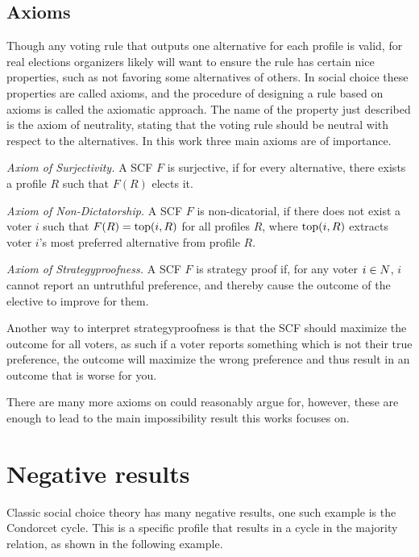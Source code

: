 \subsection{Axioms}
Though any voting rule that outputs one alternative for each profile is valid, for real elections organizers likely will want to ensure the rule has certain nice properties, such as not favoring some alternatives of others. In social choice these properties are called axioms, and the procedure of designing a rule based on axioms is called the axiomatic approach. The name of the property just described is the axiom of neutrality, stating that the voting rule should be neutral with respect to the alternatives. In this work three main axioms are of importance.

\textit{Axiom of Surjectivity.} A SCF $F$ is surjective, if for every alternative, there exists a profile $R$ such that $F(R)$ elects it.

\textit{Axiom of Non-Dictatorship.} A SCF $F$ is non-dicatorial, if there does not exist a voter $i$ such that $F(R) = \textnormal{top}(i,R)$ for all profiles $R$, where $\textnormal{top}(i,R)$  extracts voter $i$'s most preferred alternative from profile $R$.

\textit{Axiom of Strategyproofness.} A SCF $F$ is strategy proof if, for any voter $i \in N$, $i$ cannot report an untruthful preference, and thereby cause the outcome of the elective to improve for them.

Another way to interpret strategyproofness is that the SCF should maximize the outcome for all voters, as such  if a voter reports something which is not their true preference, the outcome will maximize the wrong preference and thus result in an outcome that is worse for you.

There are many more axioms on could reasonably argue for, however, these are enough to lead to the main impossibility result this works focuses on.

\section{Negative results}
Classic social choice theory has many negative results, one such example is the Condorcet cycle. This is a specific profile that results in a cycle in the majority relation, as shown in the following example.

